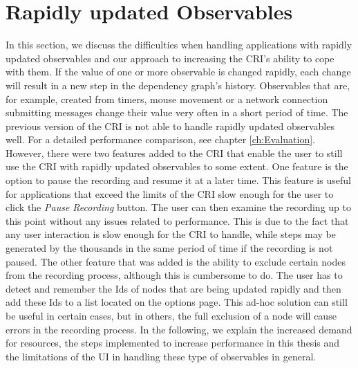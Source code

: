 \section{Rapidly updated Observables}
\label{sec:RapidlyUpdatedObservables}
In this section, we discuss the difficulties when handling applications with rapidly updated observables and our approach to increasing the CRI's ability to cope with them. If the value of one or more observable is changed rapidly, each change will result in a new step in the dependency graph's history. Observables that are, for example, created from timers, mouse movement or a network connection submitting messages change their value very often in a short period of time. The previous version of the CRI is not able to handle rapidly updated observables well. For a detailed performance comparison, see chapter \ref{ch:Evaluation}. However, there were two features added to the CRI that enable the user to still use the CRI with rapidly updated observables to some extent. One feature is the option to pause the recording and resume it at a later time. This feature is useful for applications that exceed the limits of the CRI slow enough for the user to click the \emph{Pause Recording} button. The user can then examine the recording up to this point without any issues related to performance. This is due to the fact that any user interaction is slow enough for the CRI to handle, while steps may be generated by the thousands in the same period of time if the recording is not paused. The other feature that was added is the ability to exclude certain nodes from the recording process, although this is cumbersome to do. The user has to detect and remember the Ids of nodes that are being updated rapidly and then add these Ids to a list located on the options page. This ad-hoc solution can still be useful in certain cases, but in others, the full exclusion of a node will cause errors in the recording process. In the following, we explain the increased demand for resources, the steps implemented to increase performance in this thesis and the limitations of the UI in handling these type of observables in general. 

